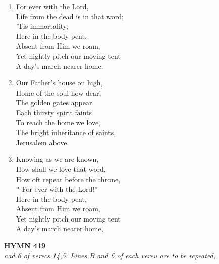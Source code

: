 \documentclass[11pt,a4paper]{article}
\begin{document}
\begin{enumerate}
    \item For ever with the Lord, \\
        Life from the dead is in that word; \\
        'Tis immortality, \\
        Here in the body pent, \\
        Absent from Him we roam, \\
        Yet nightly pitch our moving tent \\
        A day's march nearer home.

    \item Our Father's house on high, \\
        Home of the soul how dear! \\
        The golden gates appear \\
        Each thirsty spirit faints \\
        To reach the home we love, \\
        The bright inheritance of saints, \\
        Jerusalem above.

    \item Knowing as we are known, \\
        How shall we love that word, \\
        How oft repeat before the throne, \\
        * For ever with the Lord!'' \\
        Here in the body pent, \\
        Absent from Him we roam, \\
        Yet nightly pitch our moving tent \\
        A day's march nearer home,

\end{enumerate}

\newpage
\begin{center}
    {\Large \textbf{HYMN 419}}
    \\
    \textit{aad 6 of verecs 14,5. Lines B and 6 of each vereu are to be repeated,}
\end{center}
\vspace{1em}
\end{document}
